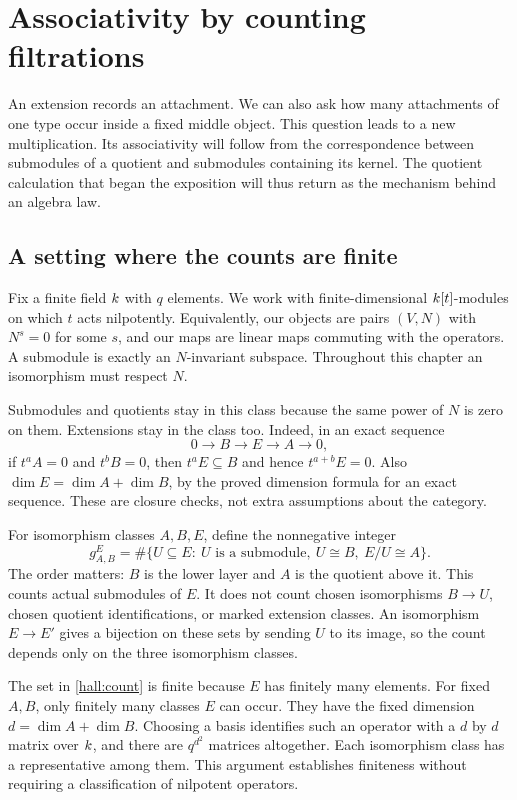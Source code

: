 \section{Associativity by counting filtrations}\label{hall:chapter}

An extension records an attachment. We can also ask how many attachments
of one type occur inside a fixed middle object. This question leads to a
new multiplication. Its associativity will follow from the correspondence
between submodules of a quotient and submodules containing its kernel.
The quotient calculation that began the exposition will thus return as
the mechanism behind an algebra law.

\subsection{A setting where the counts are finite}

Fix a finite field $k$ with $q$ elements. We work with finite-dimensional
$k[t]$-modules on which $t$ acts nilpotently. Equivalently, our objects
are pairs $(V,N)$ with $N^s=0$ for some $s$, and our maps are linear maps
commuting with the operators. A submodule is exactly an $N$-invariant
subspace. Throughout this chapter an isomorphism must respect $N$.

Submodules and quotients stay in this class because the same power of
$N$ is zero on them. Extensions stay in the class too. Indeed, in an
exact sequence
\[
0\longrightarrow B\longrightarrow E\longrightarrow A\longrightarrow0,
\]
if $t^aA=0$ and $t^bB=0$, then $t^aE\subseteq B$ and hence
$t^{a+b}E=0$. Also $\dim E=\dim A+\dim B$, by the proved dimension
formula for an exact sequence. These are closure checks, not extra
assumptions about the category.

For isomorphism classes $A,B,E$, define the nonnegative integer
\begin{equation}\label{hall:count}
g_{A,B}^{E}
=\#\{U\subseteq E:\ U\text{ is a submodule},\ U\cong B,\ E/U\cong A\}.
\end{equation}
The order matters: $B$ is the lower layer and $A$ is the quotient above it.
This counts actual submodules of $E$. It does not count chosen
isomorphisms $B\to U$, chosen quotient identifications, or marked
extension classes. An isomorphism $E\to E'$ gives a bijection on these
sets by sending $U$ to its image, so the count depends only on the three
isomorphism classes.

The set in \eqref{hall:count} is finite because $E$ has finitely many
elements. For fixed $A,B$, only finitely many classes $E$ can occur.
They have the fixed dimension $d=\dim A+\dim B$. Choosing a basis
identifies such an operator with a $d$ by $d$ matrix over $k$, and
there are $q^{d^2}$ matrices altogether. Each isomorphism class has a
representative among them. This argument establishes finiteness without
requiring a classification of nilpotent operators.

